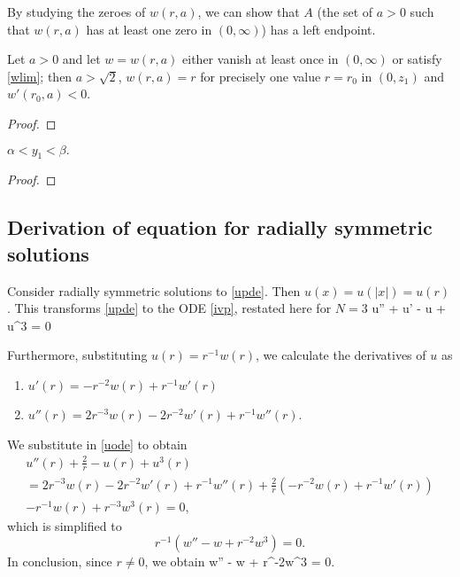 % 
% 
By studying the zeroes of $w(r,a)$, we can show that $A$ (the set of $a>0$
such that $w(r, a)$ has at least one zero in $(0, \infty)$) has a left
endpoint.

\begin{lemma}
Let $a>0$ and let $w=w(r,a)$ either vanish at least once in $(0, \infty)$
    or satisfy \eqref{wlim}; then $a>\sqrt{2}$, $w(r, a)=r$ for precisely one value
$r=r_0$ in $(0, z_1)$ and $w'(r_0, a)<0$.
\end{lemma}
\begin{proof}
\end{proof}

\begin{lemma}
    $\alpha < y_1 < \beta.$
\end{lemma}
\begin{proof}
\end{proof}


\subsection{Derivation of equation for radially symmetric solutions}\label{weqv}
Consider radially symmetric solutions to \eqref{upde}. Then $u(x) = u(|x|) =
u(r)$ . This transforms \eqref{upde} to the ODE \eqref{ivp}, restated here for
$N=3$
\be \label{uode} u'' +  u' - u + u^3 = 0 \ee 

Furthermore, substituting $u(r) = r^{-1}w(r)$, we calculate the derivatives of
$u$ as
\begin{enumerate}
    \item $u'(r) = -r^{-2}w(r) + r^{-1}w'(r)$
    \item $u''(r) = 2r^{-3}w(r) - 2r^{-2}w'(r) + r^{-1}w''(r)$.
\end{enumerate}
We substitute in \eqref{uode} to obtain
\begin{multline} 
u''(r) + \frac{2}{r} - u(r) + u^3(r) \\
= 2r^{-3}w(r) - 2r^{-2}w'(r) + r^{-1}w''(r)
+ \frac{2}{r}\left(-r^{-2}w(r) + r^{-1}w'(r)\right) \\
- r^{-1}w(r) + r^{-3}w^3(r) = 0,
\end{multline}
which is simplified to
$$ r^{-1}\left(w'' - w + r^{-2}w^3 \right) = 0. $$
In conclusion, since $r\neq 0$, we obtain
\be \label{wode} w'' - w + r^{-2}w^3 = 0. \ee

